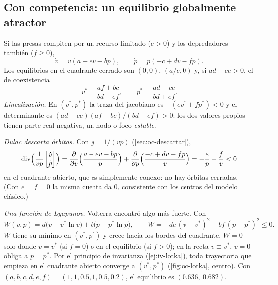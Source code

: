 \subsection{Con competencia: un equilibrio globalmente atractor}

Si las presas compiten por un recurso limitado ($e>0$) y los depredadores también ($f\ge0$),
\begin{equation}
  \dot v=v(a-ev-bp),\qquad\dot p=p(-c+dv-fp) .
  \label{eq:oc-lvc}
\end{equation}
Los equilibrios en el cuadrante cerrado son $(0,0)$, $(a/e,0)$ y, si $ad-ce>0$, el de coexistencia
\[
  v^*=\frac{af+bc}{bd+ef},\qquad p^*=\frac{ad-ce}{bd+ef} .
\]
\emph{Linealización.} En $(v^*,p^*)$ la traza del jacobiano es $-(ev^*+fp^*)<0$ y el determinante es $(ad-ce)(af+bc)/(bd+ef)>0$: los dos valores propios tienen parte real negativa, un nodo o foco \emph{estable}.

\emph{Dulac descarta órbitas.} Con $g=1/(vp)$ (\cref{sec:oc-descartar}),
\[
  \operatorname{div}\Bigl(\frac1{vp}\begin{bmatrix}\dot v\\ \dot p\end{bmatrix}\Bigr)=\frac{\partial}{\partial v}\Bigl(\frac{a-ev-bp}{p}\Bigr)+\frac{\partial}{\partial p}\Bigl(\frac{-c+dv-fp}{v}\Bigr)=-\frac ep-\frac fv<0
\]
en el cuadrante abierto, que es simplemente conexo: no hay órbitas cerradas. (Con $e=f=0$ la misma cuenta da $0$, consistente con los centros del modelo clásico.)

\emph{Una función de Lyapunov.} Volterra encontró algo más fuerte. Con
\[
  W(v,p)=d\bigl(v-v^*\ln v\bigr)+b\bigl(p-p^*\ln p\bigr),\qquad
  \dot W=-de\,(v-v^*)^2-bf\,(p-p^*)^2\le0 .
\]
$W$ tiene su mínimo en $(v^*,p^*)$ y crece hacia los bordes del cuadrante. $\dot W=0$ solo donde $v=v^*$ (si $f=0$) o en el equilibrio (si $f>0$); en la recta $v\equiv v^*$, $\dot v=0$ obliga a $p=p^*$. Por el principio de invarianza (\cref{ej:iv-lotka}), toda trayectoria que empieza en el cuadrante abierto converge a $(v^*,p^*)$ (\cref{fig:oc-lotka}, centro). Con $(a,b,c,d,e,f)=(1,1,0.5,1,0.5,0.2)$, el equilibrio es $(0.636,\ 0.682)$.


